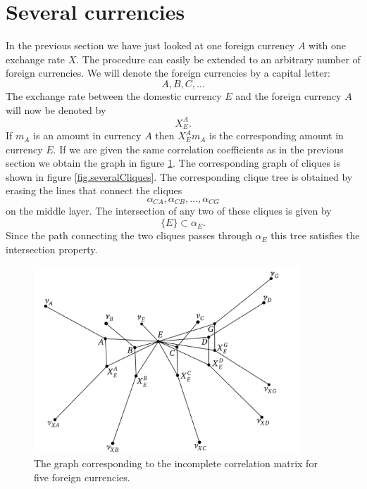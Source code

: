 \documentclass[11pt, a4paper]{article}
\begin{document}
\section{Several currencies}\label{sec.several}
In the previous section we have just looked at one foreign currency $A$ with one exchange rate $X$. The procedure can easily be extended to an arbitrary number of foreign currencies. We will denote the foreign currencies by a capital letter:
\begin{equation}
	A, B, C, \ldots
\end{equation}
The exchange rate between the domestic currency $E$ and the foreign currency $A$ will now be denoted by 
\begin{equation}
	X_E^A.
\end{equation}
If $m_A$ is an amount in currency $A$ then $X_E^Am_A$ is the corresponding amount in currency $E$. If we are given the same correlation coefficients as in the previous section we obtain the graph in figure \ref{fig.several}. The corresponding graph of cliques is shown in figure \ref{fig.severalCliques}. The corresponding clique tree is obtained by erasing the lines that connect the cliques 
\begin{equation}
	\alpha_{CA}, \alpha_{CB}, \ldots, \alpha_{CG}
\end{equation}
on the middle layer. The intersection of any two of these cliques is given by
\begin{equation}
	\{E\} \subset \alpha_E.
\end{equation}
Since the path connecting the two cliques passes through $\alpha_E$ this tree satisfies the intersection property. 

\begin{figure}[hbt]
  \begin{center}
  	\includegraphics[width=10cm]{img/severalCurrencies.png}
  \end{center}
  \caption{The graph corresponding to the incomplete correlation matrix for five foreign currencies.}\label{fig.several}
\end{figure}
\end{document}
